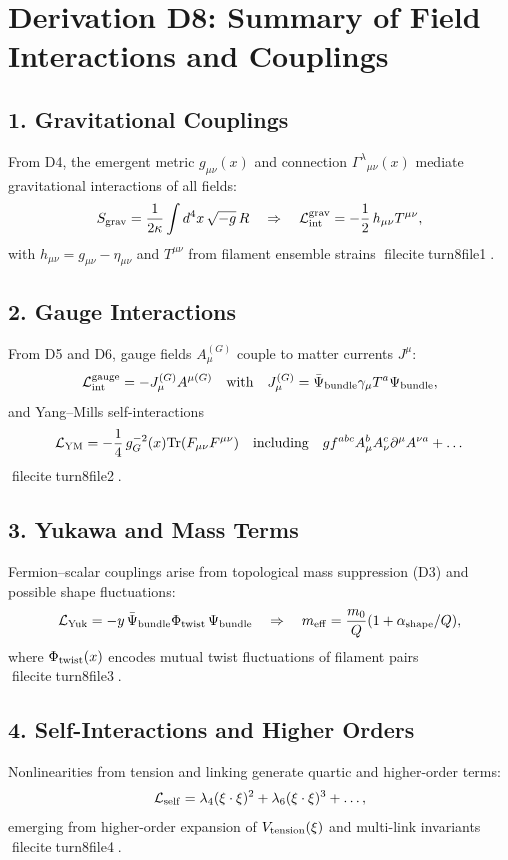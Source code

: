 
\section*{Derivation D8: Summary of Field Interactions and Couplings}
\subsection*{1. Gravitational Couplings}
From D4, the emergent metric \(g_{\mu\nu}(x)\) and connection \(\Gamma^\lambda{}_{\mu\nu}(x)\) mediate gravitational interactions of all fields:
\[
S_{\rm grav} = \frac{1}{2\kappa}\int d^4x\,\sqrt{-g}\,R
\quad\Rightarrow\quad
\mathcal{L}_{\rm int}^{\rm grav} = -\frac12\,h_{\mu\nu}T^{\mu\nu},
\]
with \(h_{\mu\nu}=g_{\mu\nu}-\eta_{\mu\nu}\) and \(T^{\mu\nu}\) from filament ensemble strains fileciteturn8file1.

\subsection*{2. Gauge Interactions}
From D5 and D6, gauge fields \(A_\mu^{(G)}\) couple to matter currents \(J^\mu\):
\[
\mathcal{L}_{\rm int}^{\rm gauge} 
= -J_\mu^{(G)}A^{\mu(G)}
\quad\text{with}\quad
J_\mu^{(G)} = \bar\Psi_{\rm bundle}\gamma_\mu T^a\Psi_{\rm bundle},
\]
and Yang–Mills self-interactions
\[
\mathcal{L}_{\rm YM} 
= -\frac14\,g_G^{-2}(x)\mathrm{Tr}(F_{\mu\nu}F^{\mu\nu})
\quad\text{including}\quad
g f^{abc}A^b_\mu A^c_\nu\partial^\mu A^{\nu a} + \dots
\] fileciteturn8file2.

\subsection*{3. Yukawa and Mass Terms}
Fermion–scalar couplings arise from topological mass suppression (D3) and possible shape fluctuations:
\[
\mathcal{L}_{\rm Yuk}
= -y\,\bar\Psi_{\rm bundle}\Phi_{\rm twist}\,\Psi_{\rm bundle}
\quad\Rightarrow\quad
m_{\rm eff} = \frac{m_0}{Q}(1 + \alpha_{\rm shape}/Q),
\]
where \(\Phi_{\rm twist}(x)\) encodes mutual twist fluctuations of filament pairs fileciteturn8file3.

\subsection*{4. Self-Interactions and Higher Orders}
Nonlinearities from tension and linking generate quartic and higher-order terms:
\[
\mathcal{L}_{\rm self}
= \lambda_4(\xi\cdot\xi)^2 + \lambda_6(\xi\cdot\xi)^3 + \dots,
\]
emerging from higher-order expansion of \(V_{\rm tension}(\xi)\) and multi-link invariants fileciteturn8file4.

